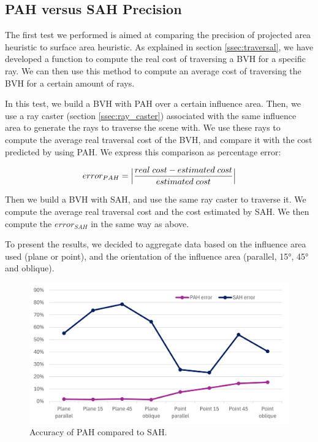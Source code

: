 \documentclass{PoliMi_MasterThesis}
\begin{document}
\subsection{PAH versus SAH Precision} \label{ssec:pah_vs_sah_precision}
The first test we performed is aimed at comparing the precision of projected area heuristic to surface area heuristic. As explained in section \ref{ssec:traversal}, we have developed a function to compute the real cost of traversing a BVH for a specific ray. We can then use this method to compute an average cost of traversing the BVH for a certain amount of rays. 

In this test, we build a BVH with PAH over a certain influence area. Then, we use a ray caster (section \ref{ssec:ray_caster}) associated with the same influence area to generate the rays to traverse the scene with. We use these rays to compute the average real traversal cost of the BVH, and compare it with the cost predicted by using PAH. We express this comparison as percentage error:

$$error_{PAH} = \Big{|}\frac{real \; cost - estimated \; cost}{estimated \; cost}\Big{|}$$

Then we build a BVH with SAH, and use the same ray caster to traverse it. We compute the average real traversal cost and the cost estimated by SAH. We then compute the $error_{SAH}$ in the same way as above.

To present the results, we decided to aggregate data based on the influence area used (plane or point), and the orientation of the influence area (parallel, 15°, 45° and oblique).

\begin{figure}[H]
	\includegraphics[width=\textwidth]{Images/pah_accuracy_chart.png}
	\caption{Accuracy of PAH compared to SAH.}
	\label{fig:pah_accuracy_chart}
\end{figure}
\end{document}
